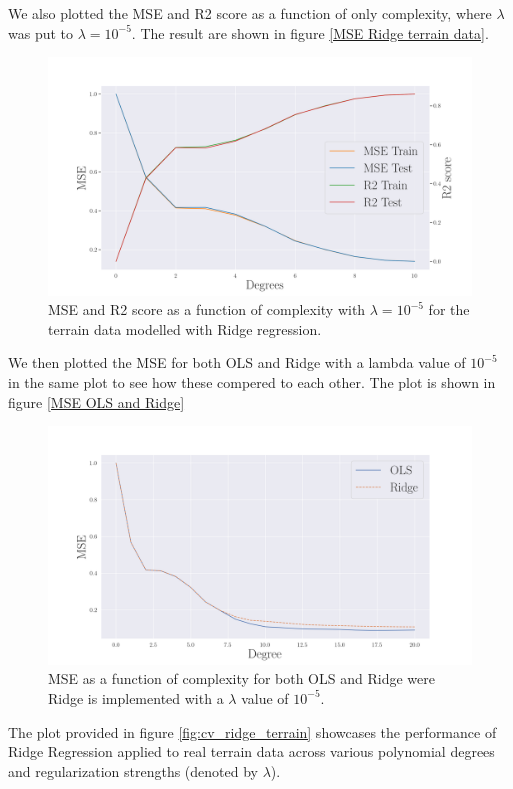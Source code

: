 \noindent We also plotted the MSE and R2 score as a function of only complexity, where $\lambda$ was put to $\lambda = 10^{-5}$. The result are shown in figure \eqref{MSE Ridge terrain data}.
\begin{figure}[H]
	\centering
	\includegraphics[width=\linewidth]{images/Figure_26.png}
	\caption{MSE and R2 score as a function of complexity with $\lambda = 10^{-5}$ for the terrain data modelled with Ridge regression. }
	\label{MSE Ridge terrain data}
\end{figure}
\noindent We then plotted the MSE for both OLS and Ridge with a lambda value of $10^{-5}$ in the same plot to see how these compered to each other. The plot is shown in figure \eqref{MSE OLS and Ridge}
\begin{figure}[H]
	\centering
	\includegraphics[width=\linewidth]{images/Figure_27.png}
	\caption{MSE as a function of complexity for both OLS and Ridge were Ridge is implemented with a $\lambda$ value of $10^{-5}$. }
	\label{MSE OLS and Ridge}
\end{figure}
%
\noindent The plot provided in figure \eqref{fig:cv_ridge_terrain} showcases the performance of Ridge Regression applied to real terrain data across various polynomial degrees and regularization strengths (denoted by $\lambda$).

